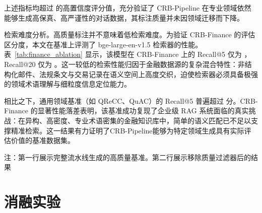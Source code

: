 上述指标均超过  的高置信度评分值，充分验证了 CRB-Pipeline 在专业领域依然能够生成高保真、高严谨性的对话数据，其标注质量并未因领域迁移而下降。

检索难度分析。高质量标注并不意味着低检索难度。为验证 CRB-Finance 的评估区分度，本文在基准上评测了 bge-large-en-v1.5 检索器的性能。表~\ref{tab:finance_ablation} 显示，该模型在 CRB-Finance 上的 Recall@5 仅为 ，Recall@20 仅为 。这一较低的检索性能归因于金融数据源的复杂混合特性：非结构化邮件、法规条文与交易记录在语义空间上高度交织，迫使检索器必须具备极强的领域术语理解与细粒度信息定位能力。

相比之下，通用领域基准（如 QReCC、QuAC）的 Recall@5 普遍超过  分。CRB-Finance 的显著性能落差表明，该基准成功复现了企业级 RAG 系统面临的真实挑战：在异构、高密度、专业术语密集的金融知识库中，简单的语义匹配已不足以支撑精准检索。这一结果有力证明了CRB-Pipeline能够为特定领域生成具有实际评估价值的基准数据集。




\begin{table}[t]
\centering
{}
\label{tab:finance_ablation}
\setlength{\tabcolsep}{3.5pt} %


\parbox{\linewidth}{\footnotesize 注：第一行展示完整流水线生成的高质量基准。第二行展示移除质量过滤器后的结果}
\end{table}


\section{消融实验}
\label{sec:ablation_study}

